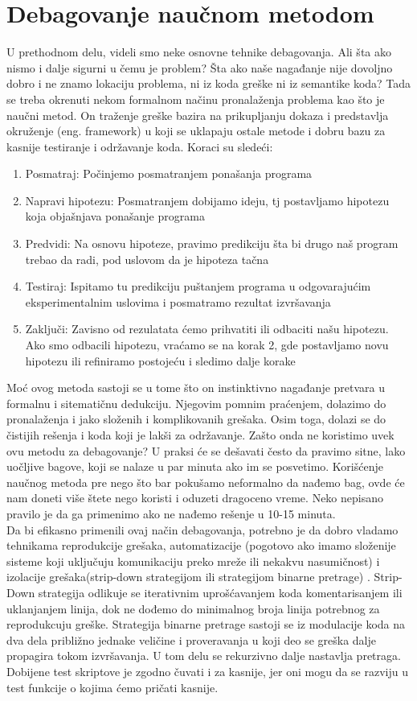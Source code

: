 \documentclass[a4paper]{article}
\begin{document}
\section{Debagovanje naučnom metodom}
U prethodnom delu, videli smo neke osnovne tehnike debagovanja. Ali šta ako nismo i dalje sigurni u čemu je problem? Šta ako naše nagađanje nije dovoljno dobro i ne znamo lokaciju problema, ni iz koda greške ni iz semantike koda? Tada se treba okrenuti nekom formalnom načinu pronalaženja problema kao što je naučni metod. On traženje greške bazira na prikupljanju dokaza i predstavlja okruženje (eng. framework) u koji se uklapaju ostale metode i dobru bazu za kasnije testiranje i održavanje koda.
	 Koraci su sledeći\cite{proPyDeb}:
	 \begin{enumerate}
	     \item Posmatraj: Počinjemo posmatranjem ponašanja programa 
	     \item Napravi hipotezu: Posmatranjem dobijamo ideju, tj postavljamo hipotezu koja objašnjava ponašanje programa
	     \item Predvidi: Na osnovu hipoteze, pravimo predikciju šta bi drugo naš program trebao da radi, pod uslovom da je hipoteza tačna
	     \item Testiraj: Ispitamo tu predikciju puštanjem programa u odgovarajućim eksperimentalnim uslovima i posmatramo rezultat izvršavanja
	     \item Zaključi: Zavisno od rezulatata ćemo prihvatiti ili odbaciti našu hipotezu. Ako smo odbacili hipotezu, vraćamo se na korak 2, gde postavljamo novu hipotezu ili refiniramo postojeću i sledimo dalje korake
	 \end{enumerate}

	Moć ovog metoda sastoji se u tome što on instinktivno nagađanje pretvara u formalnu i sitematičnu dedukciju. Njegovim pomnim praćenjem, dolazimo do pronalaženja i jako složenih i komplikovanih grešaka. Osim toga, dolazi se do čistijih rešenja i koda koji je lakši za održavanje.
	Zašto onda ne koristimo uvek ovu metodu za debagovanje?  U praksi će se dešavati često da pravimo sitne, lako uočljive bagove, koji se nalaze u par minuta ako im se posvetimo. Korišćenje naučnog metoda pre nego što bar pokušamo neformalno da nađemo bag, ovde će nam doneti više štete nego koristi i oduzeti dragoceno vreme. Neko nepisano pravilo je da ga primenimo ako ne nađemo rešenje u 10-15 minuta. \\
	Da bi efikasno primenili ovaj način debagovanja, potrebno je da dobro vladamo tehnikama reprodukcije grešaka, automatizacije (pogotovo ako imamo složenije sisteme koji uključuju komunikaciju preko mreže ili nekakvu nasumičnost) i izolacije grešaka(strip-down strategijom ili strategijom binarne pretrage) \cite{proPyDeb}.
	Strip-Down strategija odlikuje se iterativnim uprošćavanjem koda komentarisanjem ili uklanjanjem linija, dok ne dođemo do minimalnog broja linija potrebnog za  reprodukcuju greške. Strategija binarne pretrage sastoji se iz modulacije koda na dva dela približno jednake veličine i proveravanja u koji deo se greška dalje propagira tokom izvršavanja. U tom delu se rekurzivno dalje nastavlja pretraga. Dobijene test skriptove je zgodno čuvati i za kasnije, jer oni mogu da se razviju u test funkcije o kojima ćemo pričati kasnije.
\end{document}

